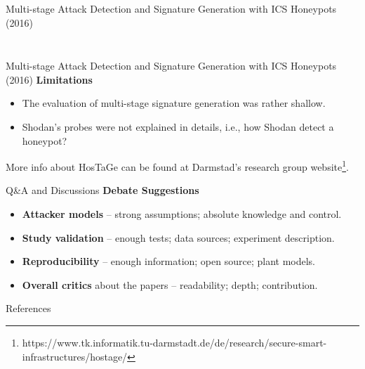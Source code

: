 \documentclass[compress]{beamer}
\begin{document}
\begin{frame}{Multi-stage Attack Detection and Signature Generation with ICS Honeypots (2016)}
\begin{columns}
\begin{column}{0.45\textwidth}
\begin{figure}
      \label{fig:hostage-ip-sources}
      \end{figure}
     \end{column}
    \end{columns}
\end{frame}
\begin{frame}{Multi-stage Attack Detection and Signature Generation with ICS Honeypots (2016)}
    \textbf{Limitations}
    \begin{itemize}
     \item The evaluation of multi-stage signature generation was rather shallow.
     \item Shodan's probes were not explained in details, i.e., how Shodan detect a honeypot?
    \end{itemize}
    More info about HosTaGe can be found at Darmstad's research group website\footnote{https://www.tk.informatik.tu-darmstadt.de/de/research/secure-smart-infrastructures/hostage/}.
\end{frame}

\begin{frame}{Q\&A and Discussions}
      \textbf{Debate Suggestions}
      \begin{itemize}
       \item \textbf{Attacker models} \cite{pasqualetti2013attack,genge2015system} -- strong assumptions; absolute knowledge and control.
       \item \textbf{Study validation} -- enough tests; data sources; experiment description.
       \item \textbf{Reproducibility} -- enough information; open source; plant models.
       \item \textbf{Overall critics} about the papers -- readability; depth; contribution.
      \end{itemize}

\end{frame}

\begin{frame}[allowframebreaks]{References}\tiny{
\def\newblock{}

}
\end{frame}
\end{document}
